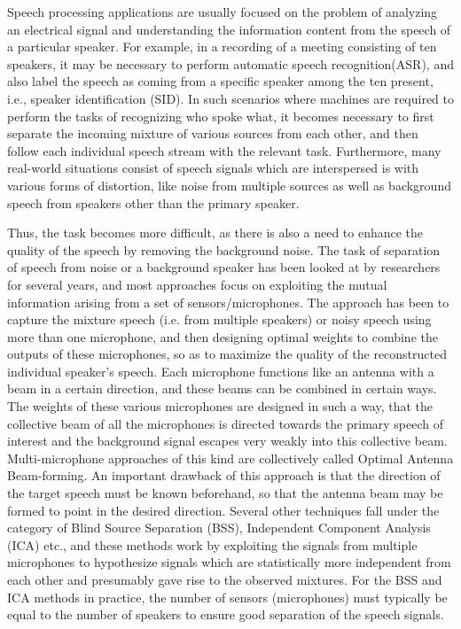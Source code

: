 \documentclass[a4paper,12pt]{report} %
\begin{document}
Speech processing applications are usually focused on the problem of analyzing an electrical signal and understanding the information content from the speech of a particular speaker. For example, in a recording of a meeting consisting of ten speakers, it may be necessary to perform automatic speech recognition(ASR), and also label the speech as coming from a specific speaker among the ten present, i.e., speaker identification (SID). In such scenarios where machines are required to perform the tasks of recognizing who spoke what, it becomes necessary to first separate the incoming mixture of various sources from each other, and then follow each individual speech stream with the relevant task. Furthermore, many real-world situations consist of speech signals which are interspersed is with various forms of distortion, like noise from multiple sources as well as background speech from speakers other than the primary speaker.\par
Thus, the task becomes more difficult, as there is also a need to enhance the quality of the speech by removing the background noise. The task of separation of speech from noise or a background speaker has been looked at by researchers for several years, and most approaches focus on exploiting the mutual information arising from a set of sensors/microphones. The approach has been to capture the mixture speech (i.e. from multiple speakers) or noisy speech using more than one microphone, and then designing optimal weights to combine the outputs of these microphones, so as to maximize the quality of the reconstructed individual speaker’s speech. Each microphone functions like an antenna with a beam in a certain direction, and these beams can be combined in certain ways. The weights of these various microphones are designed in such a way, that the collective beam of all the microphones is directed towards the primary speech of interest and the background signal escapes very weakly into this collective beam. Multi-microphone approaches of this kind are collectively called Optimal Antenna Beam-forming. An important drawback of this approach is that the direction of the target speech must be known beforehand, so that the antenna beam may be formed to point in the desired direction. Several other techniques fall under the category of Blind Source Separation (BSS), Independent Component Analysis (ICA) etc., and these methods work by exploiting the signals from multiple microphones to hypothesize signals which are statistically more independent from each other and presumably gave rise to the observed mixtures. For the BSS and ICA methods in practice, the number of sensors (microphones) must typically be equal to the number of speakers to ensure good separation of the speech signals.   
\end{document}
